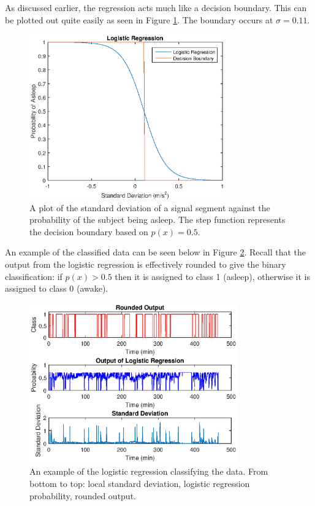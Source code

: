                 As discussed earlier, the regression acts much like a decision boundary. This can be plotted out quite easily as seen in Figure \ref{img_regression}. The boundary occurs at $\sigma = 0.11$.

                \begin{figure}[h]
                    \includegraphics[width=0.75\textwidth]{Images/logistic_regression.eps}
                    \centering
                    \caption{A plot of the standard deviation of a signal segment against the probability of the subject being asleep. The step function represents the decision boundary based on $p(x) = 0.5$.}
                    \label{img_regression}
                \end{figure}

                An example of the classified data can be seen below in Figure \ref{img_regression_ex}. Recall that the output from the logistic regression is effectively rounded to give the binary classification: if $p(x) > 0.5$ then it is assigned to class 1 (asleep), otherwise it is assigned to class 0 (awake).

                \begin{figure}[h]
                    \includegraphics[width=0.8\textwidth]{Images/logistic_regression_ex.eps}
                    \centering
                    \caption{An example of the logistic regression classifying the data. From bottom to top: local standard deviation, logistic regression probability, rounded output.}
                    \label{img_regression_ex}
                \end{figure}

